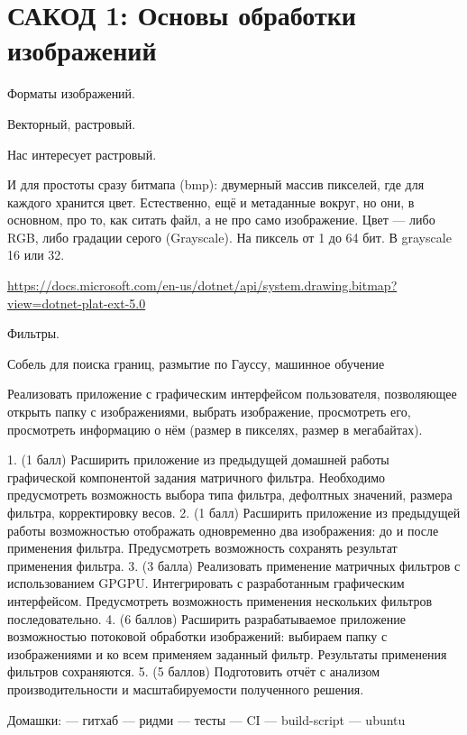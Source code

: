 \section{САКОД 1: Основы обработки изображений}

Форматы изображений.

Векторный, растровый.

Нас интересует растровый.

И для простоты сразу битмапа (bmp): двумерный массив пикселей, где для каждого хранится цвет.
Естественно, ещё и метаданные вокруг, но они, в основном, про то, как ситать файл, а не про само изображение.
Цвет --- либо RGB, либо градации серого (Grayscale). На пиксель от 1 до 64 бит. В grayscale 16 или 32.

\href{Bitmap in .NET}{https://docs.microsoft.com/en-us/dotnet/api/system.drawing.bitmap?view=dotnet-plat-ext-5.0}


Фильтры.

Собель для поиска границ, размытие по Гауссу, машинное обучение


Реализовать приложение с графическим интерфейсом пользователя, позволяющее открыть папку с изображениями, выбрать изображение, просмотреть его, просмотреть информацию о нём (размер в пикселях, размер в мегабайтах). 

    1. (1 балл) Расширить приложение из предыдущей домашней работы графической компонентой задания матричного фильтра. Необходимо предусмотреть возможность выбора типа фильтра, дефолтных значений, размера фильтра, корректировку весов.
    2. (1 балл) Расширить приложение из предыдущей работы возможностью отображать одновременно два изображения: до и после применения фильтра. Предусмотреть возможность сохранять результат применения фильтра.
    3. (3 балла) Реализовать применение матричных фильтров с использованием GPGPU. Интегрировать с разработанным графическим интерфейсом. Предусмотреть возможность применения нескольких фильтров последовательно.
    4. (6 баллов) Расширить разрабатываемое приложение возможностью потоковой обработки изображений: выбираем папку с изображениями и ко всем применяем заданный фильтр. Результаты применения фильтров сохраняются.
    5. (5 баллов) Подготовить отчёт с анализом производительности и масштабируемости полученного решения.


    Домашки:
    --- гитхаб
    --- ридми
    --- тесты
    --- CI
    --- build-script
    --- ubuntu